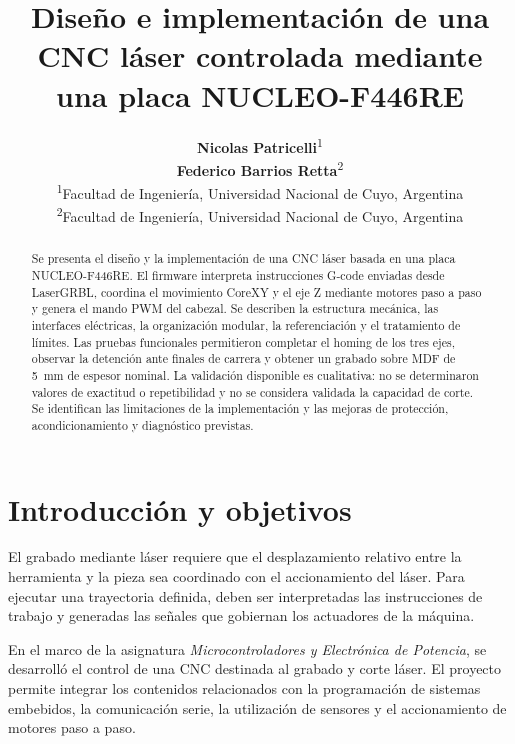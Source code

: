 \documentclass[blue,fullpaper]{ludusofficial}  %
\title{Diseño e implementación de una CNC láser controlada mediante una placa NUCLEO-F446RE}
\author{%
    \textbf{Nicolas Patricelli}\textsuperscript{1}\\
    [0.2cm]
    \textbf{Federico Barrios Retta}\textsuperscript{2}\\
    [0.2cm]
    \mdseries\small\textsuperscript{1}Facultad de Ingeniería, Universidad Nacional de Cuyo, Argentina\\
    \mdseries\small\textsuperscript{2}Facultad de Ingeniería, Universidad Nacional de Cuyo, Argentina
}
\begin{document}
\begin{abstract}

Se presenta el diseño y la implementación de una CNC láser basada en una placa NUCLEO-F446RE. El firmware interpreta instrucciones G-code enviadas desde LaserGRBL, coordina el movimiento CoreXY y el eje Z mediante motores paso a paso y genera el mando PWM del cabezal. Se describen la estructura mecánica, las interfaces eléctricas, la organización modular, la referenciación y el tratamiento de límites. Las pruebas funcionales permitieron completar el homing de los tres ejes, observar la detención ante finales de carrera y obtener un grabado sobre MDF de 5~mm de espesor nominal. La validación disponible es cualitativa: no se determinaron valores de exactitud o repetibilidad y no se considera validada la capacidad de corte. Se identifican las limitaciones de la implementación y las mejoras de protección, acondicionamiento y diagnóstico previstas.

\end{abstract}


\maketitle
\normalsize

\onecolumn
\raggedbottom
\setlength{\emergencystretch}{1.5em}
{\small\setlength{\parskip}{0pt}\tableofcontents}
\clearpage

\newpage

\section{Introducción y objetivos}
\label{sec:introduccion}

El grabado mediante láser requiere que el desplazamiento
relativo entre la herramienta y la pieza sea coordinado
con el accionamiento del láser. Para ejecutar una trayectoria
definida, deben ser interpretadas las instrucciones de
trabajo y generadas las señales que gobiernan los actuadores
de la máquina.

En el marco de la asignatura \textit{Microcontroladores y Electrónica de Potencia}, se desarrolló el control de una CNC destinada al grabado y corte láser. El proyecto permite integrar
los contenidos relacionados con la programación de
sistemas embebidos, la comunicación serie, la utilización
de sensores y el accionamiento de motores paso a paso.
\end{document}
